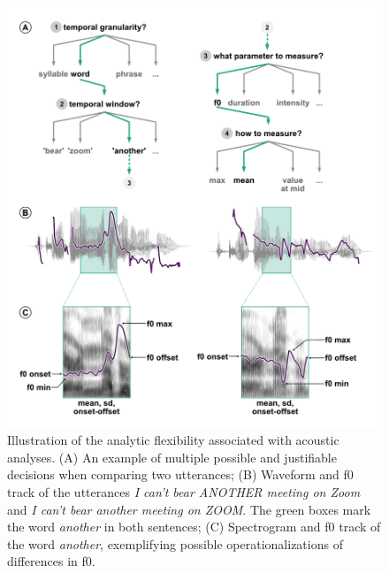 \documentclass[Review,times,sageh]{sagej}
\begin{document}
\begin{figure}
\includegraphics[width=1\linewidth]{../figs/ForkingPaths} \caption{Illustration of the analytic flexibility associated with acoustic analyses. (A) An example of multiple possible and justifiable decisions when comparing two utterances; (B) Waveform and f0 track of the utterances \emph{I can't bear ANOTHER meeting on Zoom} and \emph{I can't bear another meeting on ZOOM}. The green boxes mark the word \emph{another} in both sentences; (C) Spectrogram and f0 track of the word \emph{another}, exemplifying possible operationalizations of differences in f0.}\label{fig:forkingPaths}
\end{figure}
\end{document}
